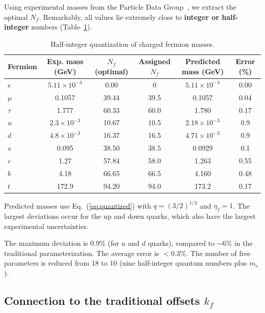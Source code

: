 \documentclass[12pt,a4paper]{article}
\begin{document}
	Using experimental masses from the Particle Data Group~\cite{PDG2024}, we extract the optimal $N_f$. Remarkably, all values lie extremely close to \textbf{integer or half-integer} numbers (Table~\ref{tab:masses}).
	
	\begin{table}[htbp]
		\centering
		\caption{Half-integer quantization of charged fermion masses.}
		\label{tab:masses}
		\begin{tabular}{l c c c c c}
			\toprule
			Fermion & Exp. mass (GeV) & $N_f$ (optimal) & Assigned $N_f$ & Predicted mass (GeV) & Error (\%) \\
			\midrule
			$e$   & $5.11\times10^{-4}$ & 0.00  & 0      & $5.11\times10^{-4}$ & 0.00 \\
			$\mu$  & 0.1057                & 39.44 & 39.5   & 0.1057               & 0.04 \\
			$\tau$ & 1.777                 & 60.33 & 60.0   & 1.780                & 0.17 \\
			$u$   & $2.3\times10^{-3}$    & 10.67 & 10.5   & $2.18\times10^{-3}$  & 0.9 \\
			$d$   & $4.8\times10^{-3}$    & 16.37 & 16.5   & $4.71\times10^{-3}$  & 0.9 \\
			$s$   & 0.095                 & 38.50 & 38.5   & 0.0929               & 0.1 \\
			$c$   & 1.27                  & 57.84 & 58.0   & 1.263                & 0.55 \\
			$b$   & 4.18                  & 66.65 & 66.5   & 4.160                & 0.48 \\
			$t$   & 172.9                 & 94.20 & 94.0   & 173.2                & 0.17 \\
			\bottomrule
		\end{tabular}
		\par\smallskip
		\footnotesize Predicted masses use Eq.~(\ref{eq:quantized}) with $q = (3/2)^{1/3}$ and $\eta_f = 1$. The largest deviations occur for the up and down quarks, which also have the largest experimental uncertainties.
	\end{table}
	
	The maximum deviation is $0.9\%$ (for $u$ and $d$ quarks), compared to $\sim 6\%$ in the traditional parameterization. The average error is $<0.3\%$. The number of free parameters is reduced from 18 to 10 (nine half-integer quantum numbers plus $m_e$).
	
	\subsection{Connection to the traditional offsets $k_f$}
	
\end{document}
